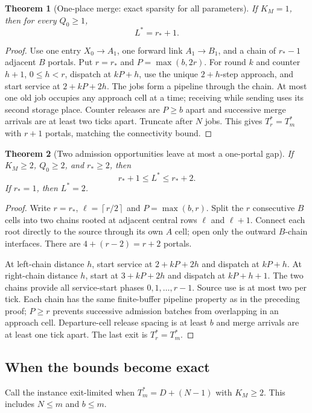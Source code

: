 \documentclass[11pt]{article}
\newtheorem{theorem}{Theorem}
\newcommand{\ceil}[1]{\left\lceil#1\right\rceil}
\begin{document}
\begin{theorem}[One-place merge: exact sparsity for all parameters]
If $K_M=1$, then for every $Q_0\ge1$,
\[
 \boxed{L^*=r_*+1.}
\]
\end{theorem}
\begin{proof}
Use one entry $X_0\to A_1$, one forward link $A_1\to B_1$, and a chain of $r_*-1$ adjacent $B$ portals. Put $r=r_*$ and $P=\max(b,2r)$. For round $k$ and counter $h+1$, $0\le h<r$, dispatch at $kP+h$, use the unique $2+h$-step approach, and start service at $2+kP+2h$. The jobs form a pipeline through the chain. At most one old job occupies any approach cell at a time; receiving while sending uses its second storage place. Counter releases are $P\ge b$ apart and successive merge arrivals are at least two ticks apart. Truncate after $N$ jobs. This gives $T_r^*=T_m^*$ with $r+1$ portals, matching the connectivity bound.
\end{proof}

\begin{theorem}[Two admission opportunities leave at most a one-portal gap]
If $K_M\ge2$, $Q_0\ge2$, and $r_*\ge2$, then
\[
 \boxed{r_*+1\le L^*\le r_*+2.}
\]
If $r_*=1$, then $L^*=2$.
\end{theorem}
\begin{proof}
Write $r=r_*$, $\ell=\ceil{r/2}$ and $P=\max(b,r)$. Split the $r$ consecutive $B$ cells into two chains rooted at adjacent central rows $\ell$ and $\ell+1$. Connect each root directly to the source through its own $A$ cell; open only the outward $B$-chain interfaces. There are $4+(r-2)=r+2$ portals.

At left-chain distance $h$, start service at $2+kP+2h$ and dispatch at $kP+h$. At right-chain distance $h$, start at $3+kP+2h$ and dispatch at $kP+h+1$. The two chains provide all service-start phases $0,1,\ldots,r-1$. Source use is at most two per tick. Each chain has the same finite-buffer pipeline property as in the preceding proof; $P\ge r$ prevents successive admission batches from overlapping in an approach cell. Departure-cell release spacing is at least $b$ and merge arrivals are at least one tick apart. The last exit is $T_r^*=T_m^*$.
\end{proof}

\subsection{When the bounds become exact}
Call the instance exit-limited when $T_m^*=D+(N-1)$ with $K_M\ge2$. This includes $N\le m$ and $b\le m$.
\end{document}
